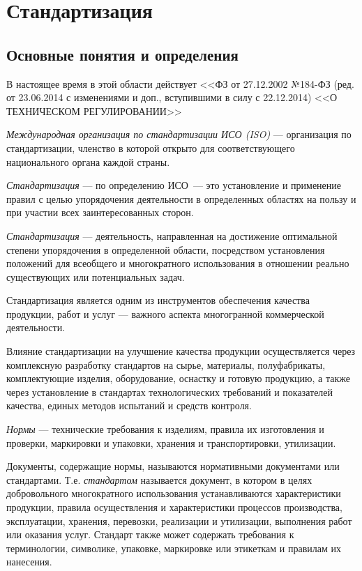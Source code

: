 \chapter{Стандартизация}
\section{Основные понятия и определения}
В настоящее время в этой области действует <<ФЗ от 27.12.2002 №184-ФЗ (ред. от 23.06.2014 с изменениями и доп., вступившими в силу с 22.12.2014) <<О ТЕХНИЧЕСКОМ РЕГУЛИРОВАНИИ>>

\textit{Международная организация по стандартизации ИСО (ISO)} --- организация по стандартизации, членство в которой открыто для соответствующего национального органа каждой страны.

\textit{Стандартизация} --- по определению ИСО~--- это установление и применение правил с целью упорядочения деятельности в определенных областях на пользу и при участии всех заинтересованных сторон.

\textit{Стандартизация} --- деятельность, направленная на достижение оптимальной степени упорядочения в определенной области, посредством установления положений для всеобщего и многократного использования в отношении реально существующих или потенциальных задач.

Стандартизация является одним из инструментов обеспечения качества продукции, работ и услуг --- важного аспекта многогранной коммерческой деятельности.

Влияние стандартизации на улучшение качества продукции осуществляется через комплексную разработку стандартов на сырье, материалы, полуфабрикаты, комплектующие изделия, оборудование, оснастку и готовую продукцию, а также через установление в стандартах технологических требований и показателей качества, единых методов испытаний и средств контроля.

\textit{Нормы} --- технические требования к изделиям, правила их изготовления и проверки, маркировки и упаковки, хранения и транспортировки, утилизации.

Документы, содержащие нормы, называются нормативными документами или стандартами. Т.е. \textit{стандартом} называется документ, в котором в целях добровольного многократного использования устанавливаются характеристики продукции, правила осуществления и характеристики процессов производства, эксплуатации, хранения, перевозки, реализации и утилизации, выполнения работ или оказания услуг. Стандарт также может содержать требования к терминологии, символике, упаковке, маркировке или этикеткам и правилам их нанесения.

